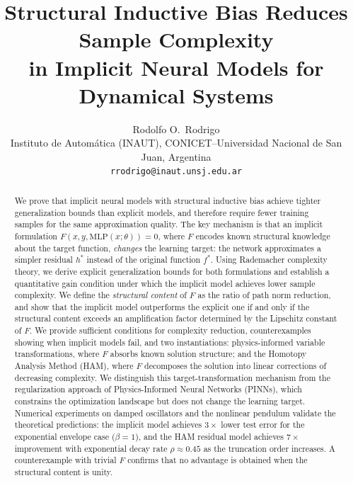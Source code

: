 \documentclass[12pt]{article}
\newcommand{\MLP}{\mathrm{MLP}}
\begin{document}
\title{Structural Inductive Bias Reduces Sample Complexity\\
in Implicit Neural Models for Dynamical Systems}

\author{Rodolfo O.\ Rodrigo\\[4pt]
  \small Instituto de Autom\'atica (INAUT),
  CONICET--Universidad Nacional de San Juan, Argentina\\
  \small \texttt{rrodrigo@inaut.unsj.edu.ar}}
\date{}
\maketitle

\begin{abstract}
We prove that implicit neural models with structural inductive bias
achieve tighter generalization bounds than explicit models, and
therefore require fewer training samples for the same approximation
quality.
The key mechanism is that an implicit formulation
$F(x, y, \MLP(x;\theta)) = 0$, where $F$ encodes known structural
knowledge about the target function, \emph{changes} the learning
target: the network approximates a simpler residual $h^*$ instead
of the original function $f^*$.
Using Rademacher complexity theory, we derive explicit generalization
bounds for both formulations and establish a quantitative gain
condition under which the implicit model achieves lower sample
complexity.
We define the \emph{structural content} of $F$ as the ratio of path
norm reduction, and show that the implicit model outperforms the
explicit one if and only if the structural content exceeds an
amplification factor determined by the Lipschitz constant of $F$.
We provide sufficient conditions for complexity reduction,
counterexamples showing when implicit models fail, and two
instantiations: physics-informed variable transformations, where $F$
absorbs known solution structure; and the Homotopy Analysis Method
(HAM), where $F$ decomposes the solution into linear corrections of
decreasing complexity.
We distinguish this target-transformation mechanism from the
regularization approach of Physics-Informed Neural Networks (PINNs),
which constrains the optimization landscape but does not change the
learning target.
Numerical experiments on damped oscillators and the nonlinear
pendulum validate the theoretical predictions: the implicit model
achieves $3\times$ lower test error for the exponential envelope
case ($\beta = 1$), and the HAM residual model achieves
$7\times$ improvement with exponential decay rate $\rho \approx 0.45$
as the truncation order increases.
A counterexample with trivial $F$ confirms that no advantage is
obtained when the structural content is unity.
\end{abstract}
\end{document}
